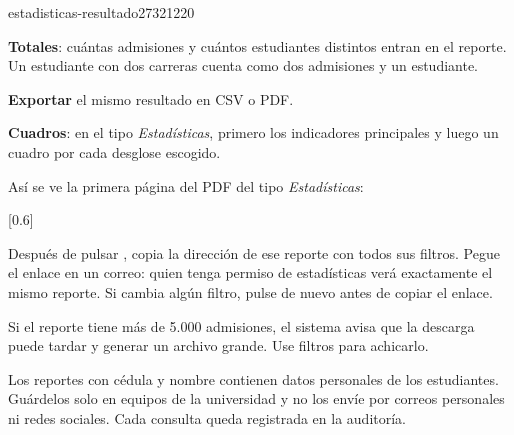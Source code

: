 \begin{captura}{estadisticas-resultado}{2732}{1220}
\end{captura}

\begin{leyenda}
  \item[1] \textbf{Totales}: cuántas admisiones y cuántos estudiantes distintos entran en el
        reporte. Un estudiante con dos carreras cuenta como dos admisiones y un estudiante.
  \item[2] \textbf{Exportar} el mismo resultado en CSV o PDF.
  \item[3] \textbf{Cuadros}: en el tipo \emph{Estadísticas}, primero los indicadores principales
        y luego un cuadro por cada desglose escogido.
\end{leyenda}

Así se ve la primera página del PDF del tipo \emph{Estadísticas}:

[0.6\linewidth]

\begin{consejo}
Después de pulsar ,  copia la dirección de ese reporte
con todos sus filtros. Pegue el enlace en un correo: quien tenga permiso de estadísticas verá
exactamente el mismo reporte. Si cambia algún filtro, pulse de nuevo  antes
de copiar el enlace.
\end{consejo}

\begin{nota}
Si el reporte tiene más de 5.000 admisiones, el sistema avisa que la descarga puede tardar y
generar un archivo grande. Use filtros para achicarlo.
\end{nota}

\begin{importante}
Los reportes con cédula y nombre contienen datos personales de los estudiantes. Guárdelos solo
en equipos de la universidad y no los envíe por correos personales ni redes sociales. Cada
consulta queda registrada en la auditoría.
\end{importante}
